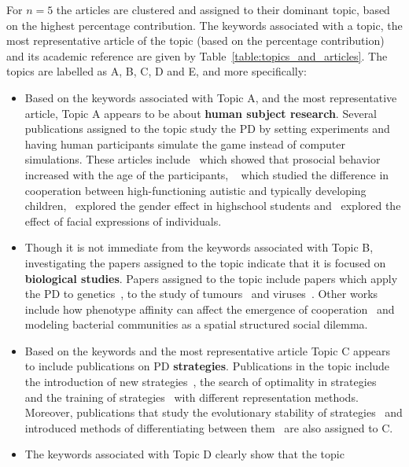 \documentclass{article}
\theoremstyle{definition}
\begin{document}
For \(n=5\) the articles are clustered and assigned to their dominant topic,
based on the highest percentage contribution. The keywords associated with a
topic, the most representative article of the topic (based on the
percentage contribution) and its academic reference are given by
Table~\ref{table:topics_and_articles}. The topics are labelled as A, B, C, D and
E, and more specifically:

\begin{itemize}
    \item Based on the keywords associated with Topic A, and the most
    representative article, Topic A appears to be about \textbf{human subject
    research}. Several publications assigned to the topic study the PD by
    setting experiments and having human participants simulate the game
    instead of computer simulations. These articles include~\citep{Matsumoto2016}
    which showed that prosocial behavior increased with the age of the
    participants, ~\citep{Li2014} which studied the difference in cooperation
    between high-functioning autistic and typically developing
    children,~\citep{Molina2013} explored the gender effect in highschool
    students and~\citep{Bell2017} explored the effect of facial expressions of
    individuals.
    \item Though it is not immediate from the keywords associated with
    Topic B, investigating the papers assigned to the topic indicate that it
    is focused on \textbf{biological studies}. Papers assigned to the topic include
    papers which apply the PD to genetics~\citep{Sistrom2015}, to
    the study of tumours~\citep{sartakhti2017} and
    viruses~\citep{Turner1999}. Other works include how phenotype affinity
    can affect the emergence of cooperation~\citep{wu2019phenotype} and modeling
    bacterial communities as a spatial structured social dilemma.
    \item Based on the keywords and the most representative article Topic
    C appears to include publications on PD \textbf{strategies}. Publications
    in the topic include the introduction of new strategies~\citep{stewart2013extortion},
    the search of optimality in strategies~\citep{banerjee2007reaching} and the
    training of strategies~\citep{ishibuchi2011evolution} with different
    representation methods. Moreover, publications that study the evolutionary
    stability of strategies~\citep{adami2013evolutionary} and introduced methods
    of differentiating between them~\citep{ashlock2008fingerprinting} are
    also assigned to C.
    \item The keywords associated with Topic D clearly show that the topic

\end{itemize}
\end{document}
